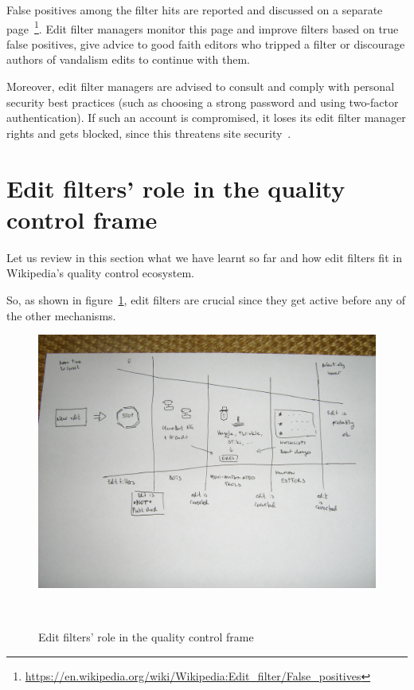 False positives among the filter hits are reported and discussed on a separate page~\footnote{\url{https://en.wikipedia.org/wiki/Wikipedia:Edit_filter/False_positives}}.
Edit filter managers monitor this page and improve filters based on true false positives, give advice to good faith editors who tripped a filter or discourage authors of vandalism edits to continue with them.

Moreover, edit filter managers are advised to consult and comply with personal security best practices (such as choosing a strong password and using two-factor authentication).
If such an account is compromised, it loses its edit filter manager rights and gets blocked, since this threatens site security~\cite{Wikipedia:EditFilter}.

\section{Edit filters' role in the quality control frame}

Let us review in this section what we have learnt so far and how edit filters fit in Wikipedia's quality control ecosystem.

So, as shown in figure~\ref{fig:funnel-with-filters}, edit filters are crucial since they get active before any of the other mechanisms.

\begin{figure}
\centering
  \includegraphics[width=0.9\columnwidth]{pics/funnel-diagramm-with-filters.JPG}
  \caption{Edit filters' role in the quality control frame}~\label{fig:funnel-with-filters}
\end{figure}

